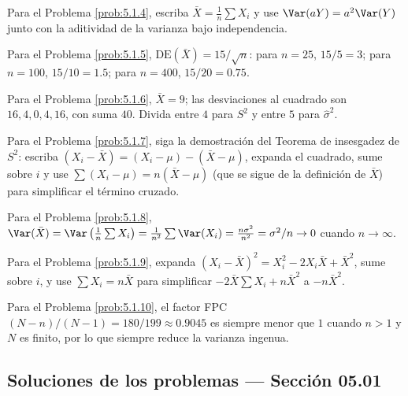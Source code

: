 \begin{sugerencia}
	\label{sug:5.1.4}
	Para el Problema \ref{prob:5.1.4}, escriba $\bar{X}=\frac{1}{n}\sum X_i$ y use $\Var(aY)=a^{2}\Var(Y)$ junto con la aditividad de la varianza bajo independencia.
\end{sugerencia}

\begin{sugerencia}
	\label{sug:5.1.5}
	Para el Problema \ref{prob:5.1.5}, $\text{DE}(\bar{X})=15/\sqrt{n}$: para $n=25$, $15/5=3$; para $n=100$, $15/10=1.5$; para $n=400$, $15/20=0.75$.
\end{sugerencia}

\begin{sugerencia}
	\label{sug:5.1.6}
	Para el Problema \ref{prob:5.1.6}, $\bar{X}=9$; las desviaciones al cuadrado son $16,4,0,4,16$, con suma $40$. Divida entre $4$ para $S^{2}$ y entre $5$ para $\hat{\sigma}^{2}$.
\end{sugerencia}

\begin{sugerencia}
	\label{sug:5.1.7}
	Para el Problema \ref{prob:5.1.7}, siga la demostración del Teorema de insesgadez de $S^2$: escriba $(X_i-\bar X)=(X_i-\mu)-(\bar X-\mu)$, expanda el cuadrado, sume sobre $i$ y use $\sum(X_i-\mu)=n(\bar X-\mu)$ (que se sigue de la definición de $\bar X$) para simplificar el término cruzado.
\end{sugerencia}

\begin{sugerencia}
	\label{sug:5.1.8}
	Para el Problema \ref{prob:5.1.8}, $\Var(\bar{X})=\Var\left(\frac{1}{n}\sum X_i\right)=\frac{1}{n^{2}}\sum\Var(X_i)=\frac{n\sigma^{2}}{n^{2}}=\sigma^{2}/n \to 0$ cuando $n\to\infty$.
\end{sugerencia}

\begin{sugerencia}
	\label{sug:5.1.9}
	Para el Problema \ref{prob:5.1.9}, expanda $(X_i-\bar X)^2 = X_i^2 - 2X_i\bar X + \bar X^2$, sume sobre $i$, y use $\sum X_i = n\bar X$ para simplificar $-2\bar X\sum X_i + n\bar X^2$ a $-n\bar X^2$.
\end{sugerencia}

\begin{sugerencia}
	\label{sug:5.1.10}
	Para el Problema \ref{prob:5.1.10}, el factor FPC $(N-n)/(N-1) = 180/199 \approx 0.9045$ es siempre menor que $1$ cuando $n>1$ y $N$ es finito, por lo que siempre reduce la varianza ingenua.
\end{sugerencia}

\subsection*{Soluciones de los problemas --- Sección 05.01}

